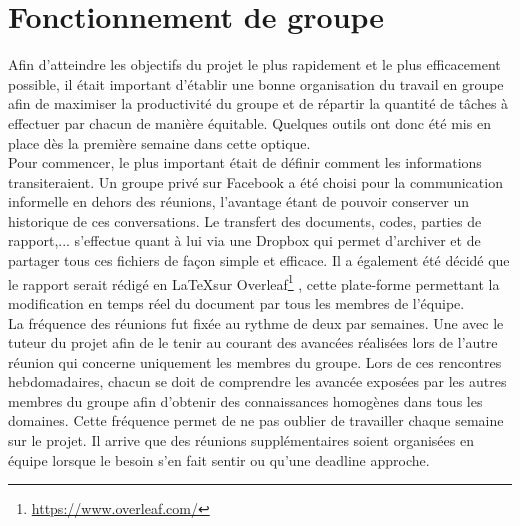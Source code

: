 \documentclass[11pt,a4paper,11pt]{report}
\begin{document}


\newpage

\chapter{Fonctionnement de groupe}

	Afin d’atteindre les objectifs du projet le plus rapidement et le plus efficacement possible, il était important d’établir une bonne organisation du travail en groupe afin de maximiser la productivité du groupe et de répartir la quantité de tâches à effectuer par chacun de manière équitable. Quelques outils ont donc été mis en place dès la première semaine dans cette optique.\\

	Pour commencer, le plus important était de définir comment les informations transiteraient. Un groupe privé sur Facebook a été choisi pour la communication informelle en dehors des réunions, l’avantage étant de pouvoir conserver un historique de ces conversations. Le transfert des documents, codes, parties de rapport,... s’effectue quant à lui via une Dropbox qui permet d'archiver et de partager tous ces fichiers de façon simple et efficace. Il a également été décidé que le rapport serait rédigé en \LaTeX sur \og Overleaf\footnote{\url{https://www.overleaf.com/}} \fg, cette plate-forme permettant la modification en temps réel du document par tous les membres de l’équipe.\\

	La fréquence des réunions fut fixée au rythme de deux par semaines. Une avec le tuteur du projet afin de le tenir au courant des avancées réalisées lors de l’autre réunion qui concerne uniquement les membres du groupe. Lors de ces rencontres hebdomadaires, chacun se doit de comprendre les avancée exposées par les autres membres du groupe afin d’obtenir des connaissances homogènes dans tous les domaines. Cette fréquence permet de ne pas oublier de travailler chaque semaine sur le projet. Il arrive que des réunions supplémentaires soient organisées en équipe lorsque le besoin s’en fait sentir ou qu’une deadline approche.\\
\end{document}
